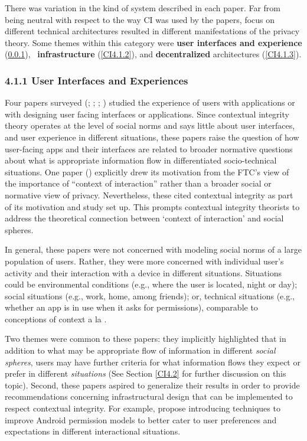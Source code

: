 \documentclass[../thesis.tex]{subfiles}
\begin{document}
There was variation in the kind of system
described in each paper. Far from being neutral with respect to the way
CI was used by the papers, focus on different technical architectures
resulted in different manifestations of the privacy theory. Some
themes within this category were \textbf{user interfaces and experience
}(\ref{CI4.1.1}), \ \textbf{infrastructure }(\ref{CI4.1.2}),
and \textbf{decentralized} architectures (\ref{CI4.1.3}).

\subsubsection{4.1.1 User Interfaces and Experiences}
\label{CI4.1.1}

Four papers surveyed (\citet{shih2010towards};
\citet{shih2015privacy}; \citet{zhang2013no};
\citet{wijesekera2015android}) studied the experience of users
with applications or with designing user facing interfaces or
applications. Since contextual integrity theory operates at the level
of social norms and says little about user interfaces, and user
experience in different situations, these papers raise the question of
how user-facing apps and their interfaces are related to broader
normative questions about what is appropriate information flow in
differentiated socio-technical situations. One paper
(\citet{zhang2013no}) explicitly drew its motivation from
the FTC's view of the importance of
``context of interaction'' rather
than a broader social or normative view of privacy. Nevertheless, these
cited contextual integrity as part of its motivation and study set up.
This prompts contextual integrity theorists to address the theoretical
connection between `context of
interaction' and social spheres.

In general, these papers were not concerned with modeling social norms
of a large population of users. Rather, they were more concerned with
individual user's activity and their interaction with a
device in different situations. Situations could be environmental
conditions (e.g., where the user is located, night or day); social
situations (e.g., work, home, among friends); or, technical situations
(e.g., whether an app is in use when it asks for permissions),
comparable to conceptions of context a la \citet{dey2001conceptual}.

Two themes were common to these papers: they implicitly highlighted that
in addition to what may be appropriate flow of information in different
\textit{social spheres}, users may have further criteria for what
information flows they expect or prefer in different
\textit{situations} (See Section \ref{CI4.2} for further discussion on this
topic). Second, these papers aspired to generalize their results in
order to provide recommendations concerning infrastructural design that
can be implemented to respect contextual integrity. For example,
\citet{wijesekera2015android} propose
introducing techniques to improve Android permission models to better
cater to user preferences and expectations in different interactional
situations.
\end{document}
